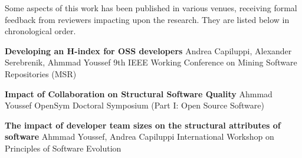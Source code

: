
\begin{publications}

Some aspects of this work has been published in various venues, receiving formal feedback  from  reviewers  impacting  upon  the  research. They are listed below in chronological order.

\textbf{Developing an H-index for OSS developers}\newline
Andrea Capiluppi, Alexander Serebrenik, Ahmmad Youssef 9th IEEE Working Conference on Mining Software Repositories (MSR)

\textbf{Impact of Collaboration on Structural Software Quality}\newline
Ahmmad Youssef OpenSym Doctoral Symposium (Part I: Open Source Software)

\textbf{The impact of developer team sizes on the structural attributes of software}\newline
Ahmmad Youssef, Andrea Capiluppi International Workshop on Principles of Software Evolution

\end{publications}
